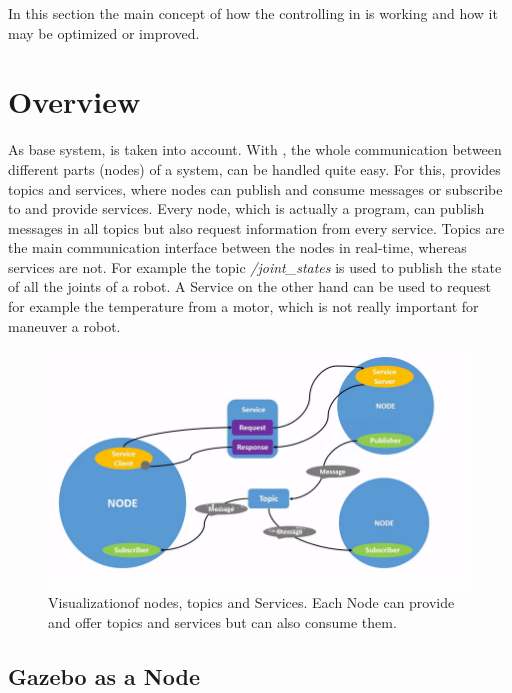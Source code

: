 
In this section the main concept of how the controlling in  is working and how it may be optimized or improved.

\section[Overview]{Overview} \label{sec:concept-overview}

As base system,  is taken into account. With , the whole communication between different parts (nodes) of a system, can be handled quite easy.
For this,  provides topics and services, where nodes can publish and consume messages or subscribe to and provide services.
Every node, which is actually a program, can publish messages in all topics but also request information from every service.
Topics are the main communication interface between the nodes in real-time, whereas services are not.
For example the topic \textit{/joint\_states} is used to publish the state of all the joints of a robot.
A Service on the other hand can be used to request for example the temperature from a motor, which is not really important for maneuver a robot.

\begin{figure}[H]
    \centering
    \includegraphics[width=0.6\linewidth]{images/NodesTopicandService}
    \caption[ Nodes, Topics and Services]{Visualization\protect\footnotemark of  \Glspl{node}, \Glspl{topic} and Services. Each Node can provide and offer topics and services but can also consume them.}
    \label{fig:ros-nodes-topics-services}
\end{figure}



\subsection[Gazebo]{Gazebo as a Node} \label{sec:gazebo-node}

